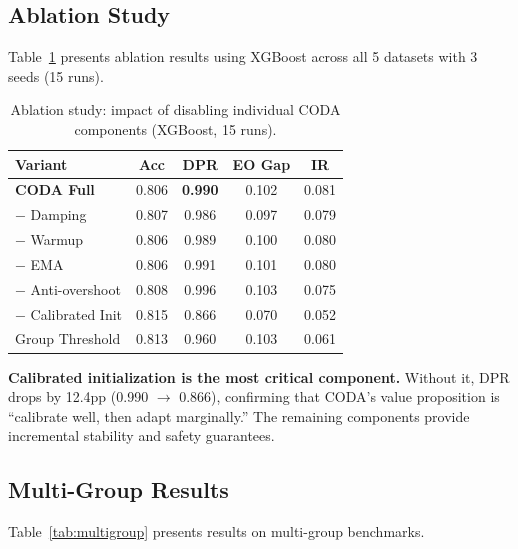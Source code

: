 \documentclass[letterpaper]{article} %
\theoremstyle{definition}
\begin{document}
\subsection{Ablation Study}

Table~\ref{tab:ablation} presents ablation results using XGBoost across all 5 datasets with 3 seeds (15 runs).

\begin{table}[t]
\centering
\caption{Ablation study: impact of disabling individual CODA components (XGBoost, 15 runs).}
\label{tab:ablation}
\small
\begin{tabular}{@{}lcccc@{}}
\toprule
Variant & Acc & DPR & EO Gap & IR \\
\midrule
\textbf{CODA Full} & 0.806 & \textbf{0.990} & 0.102 & 0.081 \\
\quad $-$ Damping & 0.807 & 0.986 & 0.097 & 0.079 \\
\quad $-$ Warmup & 0.806 & 0.989 & 0.100 & 0.080 \\
\quad $-$ EMA & 0.806 & 0.991 & 0.101 & 0.080 \\
\quad $-$ Anti-overshoot & 0.808 & 0.996 & 0.103 & 0.075 \\
\quad $-$ Calibrated Init & 0.815 & 0.866 & 0.070 & 0.052 \\
\midrule
Group Threshold & 0.813 & 0.960 & 0.103 & 0.061 \\
\bottomrule
\end{tabular}
\end{table}

\textbf{Calibrated initialization is the most critical component.} Without it, DPR drops by 12.4pp (0.990 $\to$ 0.866), confirming that CODA's value proposition is ``calibrate well, then adapt marginally.'' The remaining components provide incremental stability and safety guarantees.

\subsection{Multi-Group Results}

Table~\ref{tab:multigroup} presents results on multi-group benchmarks.
\end{document}

